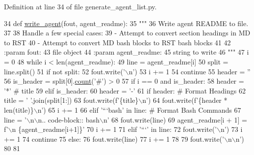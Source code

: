 Definition at line 34 of file generate\+\_\+agent\+\_\+list.\+py.


\begin{DoxyCode}
34 \textcolor{keyword}{def }\hyperlink{namespacegenerate__agent__list_aa2e399b6d39f8bb4e2f2ef644f082ac7}{write\_agent}(fout, agent\_readme):
35     \textcolor{stringliteral}{"""}
36 \textcolor{stringliteral}{    Write agent README to file.}
37 \textcolor{stringliteral}{}
38 \textcolor{stringliteral}{    Handle a few special cases:}
39 \textcolor{stringliteral}{    - Attempt to convert section headings in MD to RST}
40 \textcolor{stringliteral}{    - Attempt to convert MD bash blocks to RST bash blocks}
41 \textcolor{stringliteral}{}
42 \textcolor{stringliteral}{    :param fout:}
43 \textcolor{stringliteral}{        file object}
44 \textcolor{stringliteral}{    :param agent\_readme:}
45 \textcolor{stringliteral}{        string to write}
46 \textcolor{stringliteral}{    """}
47     i = 0
48     \textcolor{keywordflow}{while} i < len(agent\_readme):
49         line = agent\_readme[i]
50         split = line.split()
51         \textcolor{keywordflow}{if} \textcolor{keywordflow}{not} split:
52             fout.write(\textcolor{stringliteral}{'\(\backslash\)n'})
53             i += 1
54             \textcolor{keywordflow}{continue}
55         header = \textcolor{stringliteral}{''}
56         is\_header = split[0].\hyperlink{namespaceparlai_1_1agents_1_1tfidf__retriever_1_1build__tfidf_a7fc352c82f4a875b23fec3b046027039}{count}(\textcolor{stringliteral}{'#'}) > 0
57         \textcolor{keywordflow}{if} i == 0 \textcolor{keywordflow}{and} is\_header:
58             header = \textcolor{stringliteral}{'*'}  \textcolor{comment}{# title}
59         \textcolor{keywordflow}{elif} is\_header:
60             header = \textcolor{stringliteral}{'-'}
61         \textcolor{keywordflow}{if} header:  \textcolor{comment}{# Format Headings}
62             title = \textcolor{stringliteral}{' '}.join(split[1:])
63             fout.write(f\textcolor{stringliteral}{'\{title\}\(\backslash\)n'})
64             fout.write(f\textcolor{stringliteral}{'\{header * len(title)\}\(\backslash\)n'})
65             i += 1
66         \textcolor{keywordflow}{elif} \textcolor{stringliteral}{'```bash'} \textcolor{keywordflow}{in} line:  \textcolor{comment}{# Format Bash Commands}
67             line = \textcolor{stringliteral}{'\(\backslash\)n\(\backslash\)n.. code-block:: bash\(\backslash\)n'}
68             fout.write(line)
69             agent\_readme[i + 1] = f\textcolor{stringliteral}{'\(\backslash\)n  \{agent\_readme[i+1]\}'}
70             i += 1
71         \textcolor{keywordflow}{elif} \textcolor{stringliteral}{'```'} \textcolor{keywordflow}{in} line:
72             fout.write(\textcolor{stringliteral}{'\(\backslash\)n'})
73             i += 1
74             \textcolor{keywordflow}{continue}
75         \textcolor{keywordflow}{else}:
76             fout.write(line)
77             i += 1
78 
79     fout.write(\textcolor{stringliteral}{'\(\backslash\)n\(\backslash\)n'})
80 
81 
\end{DoxyCode}

